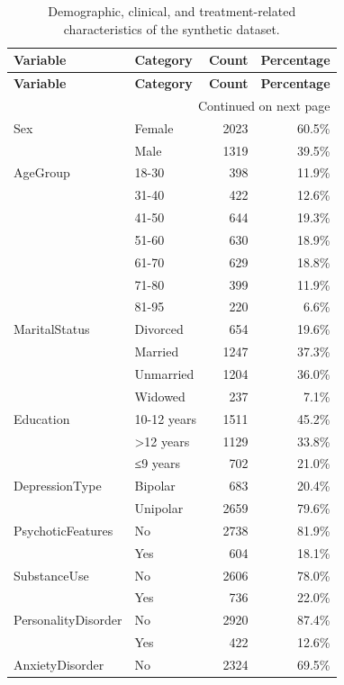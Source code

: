 
\begin{longtable}{llrr}
\caption{Demographic, clinical, and treatment-related characteristics of the synthetic dataset.}
\label{tab:datasetcharacteristics}\\
\toprule
\textbf{Variable} & \textbf{Category} & \textbf{Count} & \textbf{Percentage} \\
\midrule
\endfirsthead

\toprule
\textbf{Variable} & \textbf{Category} & \textbf{Count} & \textbf{Percentage} \\
\midrule
\endhead

\midrule
\multicolumn{4}{r}{Continued on next page} \\
\midrule
\endfoot

\bottomrule
\endlastfoot
Sex & Female & 2023 & 60.5\% \\
 & Male & 1319 & 39.5\% \\
AgeGroup & 18-30 & 398 & 11.9\% \\
 & 31-40 & 422 & 12.6\% \\
 & 41-50 & 644 & 19.3\% \\
 & 51-60 & 630 & 18.9\% \\
 & 61-70 & 629 & 18.8\% \\
 & 71-80 & 399 & 11.9\% \\
 & 81-95 & 220 & 6.6\% \\
MaritalStatus & Divorced & 654 & 19.6\% \\
 & Married & 1247 & 37.3\% \\
 & Unmarried & 1204 & 36.0\% \\
 & Widowed & 237 & 7.1\% \\
Education & 10-12 years & 1511 & 45.2\% \\
 & >12 years & 1129 & 33.8\% \\
 & ≤9 years & 702 & 21.0\% \\
DepressionType & Bipolar & 683 & 20.4\% \\
 & Unipolar & 2659 & 79.6\% \\
PsychoticFeatures & No & 2738 & 81.9\% \\
 & Yes & 604 & 18.1\% \\
SubstanceUse & No & 2606 & 78.0\% \\
 & Yes & 736 & 22.0\% \\
PersonalityDisorder & No & 2920 & 87.4\% \\
 & Yes & 422 & 12.6\% \\
AnxietyDisorder & No & 2324 & 69.5\% \\

\end{longtable}
